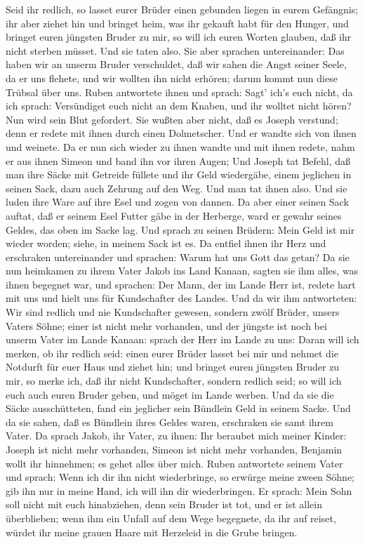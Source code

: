  Seid ihr redlich, so lasset eurer Brüder einen gebunden
liegen in eurem Gefängnis; ihr aber ziehet hin und bringet heim, was ihr
gekauft habt für den Hunger,  und bringet euren jüngsten
Bruder zu mir, so will ich euren Worten glauben, daß ihr nicht sterben
müsset. Und sie taten also.  Sie aber sprachen
untereinander: Das haben wir an unserm Bruder verschuldet, daß wir sahen
die Angst seiner Seele, da er uns flehete, und wir wollten ihn nicht
erhören; darum kommt nun diese Trübsal über uns.  Ruben
antwortete ihnen und sprach: Sagt' ich's euch nicht, da ich sprach:
Versündiget euch nicht an dem Knaben, und ihr wolltet nicht hören? Nun
wird sein Blut gefordert.  Sie wußten aber nicht, daß es
Joseph verstund; denn er redete mit ihnen durch einen Dolmetscher.
 Und er wandte sich von ihnen und weinete. Da er nun sich
wieder zu ihnen wandte und mit ihnen redete, nahm er aus ihnen Simeon
und band ihn vor ihren Augen;  Und Joseph tat Befehl, daß
man ihre Säcke mit Getreide füllete und ihr Geld wiedergäbe, einem
jeglichen in seinen Sack, dazu auch Zehrung auf den Weg. Und man tat
ihnen also.  Und sie luden ihre Ware auf ihre Esel und
zogen von dannen.  Da aber einer seinen Sack auftat, daß er
seinem Esel Futter gäbe in der Herberge, ward er gewahr seines Geldes,
das oben im Sacke lag.  Und sprach zu seinen Brüdern: Mein
Geld ist mir wieder worden; siehe, in meinem Sack ist es. Da entfiel
ihnen ihr Herz und erschraken untereinander und sprachen: Warum hat uns
Gott das getan?  Da sie nun heimkamen zu ihrem Vater Jakob
ins Land Kanaan, sagten sie ihm alles, was ihnen begegnet war, und
sprachen:  Der Mann, der im Lande Herr ist, redete hart mit
uns und hielt uns für Kundschafter des Landes.  Und da wir
ihm antworteten: Wir sind redlich und nie Kundschafter gewesen,
 sondern zwölf Brüder, unsers Vaters Söhne; einer ist nicht
mehr vorhanden, und der jüngste ist noch bei unserm Vater im Lande
Kanaan:  sprach der Herr im Lande zu uns: Daran will ich
merken, ob ihr redlich seid: einen eurer Brüder lasset bei mir und
nehmet die Notdurft für euer Haus und ziehet hin;  und
bringet euren jüngsten Bruder zu mir, so merke ich, daß ihr nicht
Kundschafter, sondern redlich seid; so will ich euch auch euren Bruder
geben, und möget im Lande werben.  Und da sie die Säcke
ausschütteten, fand ein jeglicher sein Bündlein Geld in seinem Sacke.
Und da sie sahen, daß es Bündlein ihres Geldes waren, erschraken sie
samt ihrem Vater.  Da sprach Jakob, ihr Vater, zu ihnen:
Ihr beraubet mich meiner Kinder: Joseph ist nicht mehr vorhanden, Simeon
ist nicht mehr vorhanden, Benjamin wollt ihr hinnehmen; es gehet alles
über mich.  Ruben antwortete seinem Vater und sprach: Wenn
ich dir ihn nicht wiederbringe, so erwürge meine zween Söhne; gib ihn
nur in meine Hand, ich will ihn dir wiederbringen.  Er
sprach: Mein Sohn soll nicht mit euch hinabziehen, denn sein Bruder ist
tot, und er ist allein überblieben; wenn ihm ein Unfall auf dem Wege
begegnete, da ihr auf reiset, würdet ihr meine grauen Haare mit
Herzeleid in die Grube bringen.

